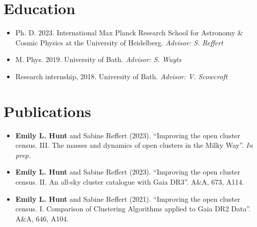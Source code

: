 \documentclass[12pt, letterpaper]{hunt-cv}
\begin{document}
\cvTitle




\section*{Education}

\begin{itemize}
    \item Ph. D. 2023. International Max Planck Research School for Astronomy \& Cosmic Physics at the University of Heidelberg. \emph{Advisor: S. Reffert}
    \item M. Phys. 2019. University of Bath. \emph{Advisor: S. Wuyts}
    \item Research internship, 2018. University of Bath. \emph{Advisor: V. Scowcroft}
\end{itemize}


\section*{Publications}

\begin{itemize}
    \item \textbf{Emily L. Hunt} and Sabine Reffert (2023). ``Improving the open cluster census. III. The masses and dynamics of open clusters in the Milky Way''. \emph{In prep.}
    \item \textbf{Emily L. Hunt} and Sabine Reffert (2023). ``Improving the open cluster census. II. An all-sky cluster catalogue with Gaia DR3''. A\&A, 673, A114.
    \item \textbf{Emily L. Hunt} and Sabine Reffert (2021). ``Improving the open cluster census. I. Comparison of Clustering Algorithms applied to Gaia DR2 Data''. A\&A, 646, A104.
\end{itemize}
\end{document}
